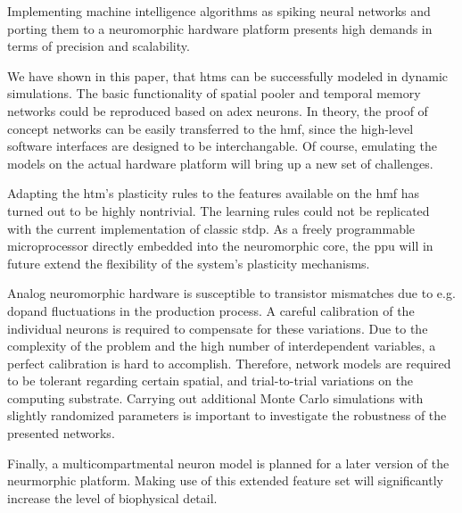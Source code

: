 Implementing machine intelligence algorithms as spiking neural networks and porting them to a neuromorphic hardware platform presents high demands in terms of precision and scalability.

We have shown in this paper, that \glspl{htm} can be successfully modeled in dynamic simulations. The basic functionality of spatial pooler and temporal memory networks could be reproduced based on \gls{adex} neurons. In theory, the proof of concept networks can be easily transferred to the \gls{hmf}, since the high-level software interfaces are designed to be interchangable. Of course, emulating the models on the actual hardware platform will bring up a new set of challenges.

Adapting the \gls{htm}'s plasticity rules to the features available on the \gls{hmf} has turned out to be highly nontrivial. The learning rules could not be replicated with the current implementation of classic \gls{stdp}. As a freely programmable microprocessor directly embedded into the neuromorphic core, the \gls{ppu} will in future extend the flexibility of the system's plasticity mechanisms.

Analog neuromorphic hardware is susceptible to transistor mismatches due to e.g. dopand fluctuations in the production process. A careful calibration of the individual neurons is required to compensate for these variations. Due to the complexity of the problem and the high number of interdependent variables, a perfect calibration is hard to accomplish. Therefore, network models are required to be tolerant regarding certain spatial, and trial-to-trial variations on the computing substrate. Carrying out additional Monte Carlo simulations with slightly randomized parameters is important to investigate the robustness of the presented networks.

Finally, a multicompartmental neuron model is planned for a later version of the neurmorphic platform. Making use of this extended feature set will significantly increase the level of biophysical detail. 

